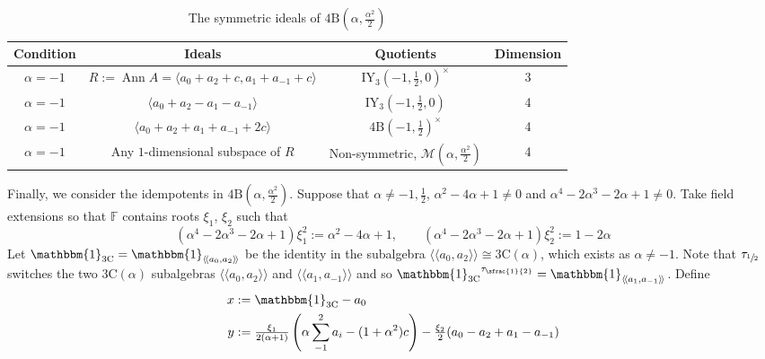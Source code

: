 \documentclass[11pt, a4paper]{article}
\theoremstyle{plain}
\theoremstyle{definition}
\newcommand\al{\alpha}
\newcommand\cM{\mathcal{M}}
\newcommand\la{\langle}
\newcommand\ra{\rangle}
\newcommand\lla{\langle\!\langle}
\newcommand\rra{\rangle\!\rangle}
\DeclareMathOperator{\Ann}{Ann}
\newcommand\FF{\mathbb{F}}
\newcommand{\B}{\mathrm{B}}
\newcommand{\C}{\mathrm{C}}
\newcommand{\IY}{\mathrm{IY}}
\newcommand{\0}{\overline{0}}
\newcommand{\2}{\overline{2}}
\newcommand{\half}{{\tau_{\sfrac{1}{2}}}} %
\newcommand{\1}{\mathbbm{1}}
\newcommand{\rt}{\xi}
\begin{document}
\begin{table}[h!tb]
	\renewcommand{\arraystretch}{1.5}
	\centering
	\footnotesize
	\begin{tabular}{c|c|c|c}
		\hline
		Condition & Ideals & Quotients & Dimension \\
		\hline
		$\al = -1$ & $R := \Ann A = \la a_0  + a_2 + c, a_1 + a_{-1} + c\ra$  & $\IY_3(-1,\tfrac{1}{2},0)^\times$ & 3 \\
		$\al =-1$ & $\la a_0  + a_2 - a_1 - a_{-1} \ra$  & $\IY_3(-1,\tfrac{1}{2},0)$ & 4\\
		$\al =-1$ & $\la a_0  + a_2 + a_1 + a_{-1} + 2c \ra$  & $4\B(-1, \tfrac{1}{2})^\times
		$ & 4\\
		$\al =-1$ & Any $1$-dimensional subspace of $R$  & Non-symmetric, $\cM(\al, \frac{\al^2}{2})$ & 4
	\end{tabular}
	\caption{The symmetric ideals of $4\B(\al, \frac{\al^2}{2})$}\label{tab:4Bprops}
\end{table}
	
Finally, we consider the idempotents in $4\B(\al, \frac{\al^2}{2})$.  Suppose that $\al \neq -1, \frac{1}{2}$, $\al^2-4\al+1 \neq 0$ and $\al^4-2\al^3-2\al+1 \neq 0$.  Take field extensions so that $\FF$ contains roots $\rt_1$, $\rt_2$ such that
\[
\left(\al^4-2\al^3-2\al+1\right)\rt_1^2 := \al^2-4\al+1, \qquad \left(\al^4-2\al^3-2\al+1\right)\rt_2^2 := 1-2\al 
\]
Let $\1_{3\C} = \1_{\lla a_0, a_2 \rra}$ be the identity in the subalgebra $\lla a_0, a_2 \rra \cong 3\C(\al)$, which exists as $\al \neq -1$.  Note that $\half$ switches the two $3\C(\al)$ subalgebras $\lla a_0, a_2 \rra$ and $\lla a_1, a_{-1} \rra$ and so ${\1_{3\C}}^\half = \1_{\lla a_1, a_{-1} \rra}$.
Define
\begin{align*}
	x &:= \1_{3\C} - a_0 \\
	y &:= \tfrac{\rt_1}{2(\al+1)}\left(\al \sum_{-1}^{2}a_{i} - (1+\al^2)c\right) - \tfrac{\rt_2}{2}(a_0-a_2+a_1-a_{-1}) 
\end{align*}
\end{document}
